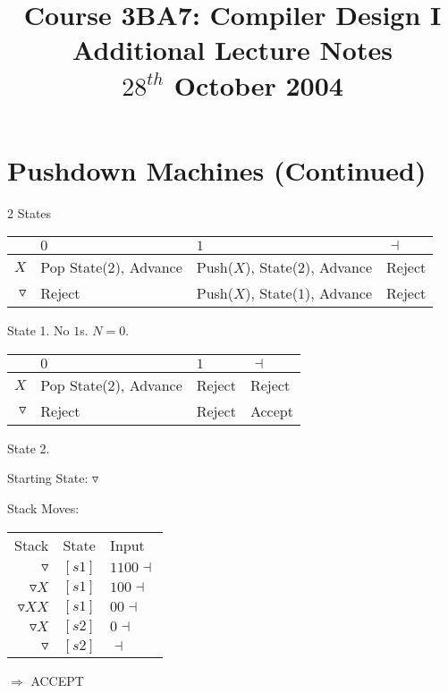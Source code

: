 \documentclass[a4paper,12pt]{article}
\begin{document}
\title{Course 3BA7: Compiler Design I \\ Additional Lecture Notes \\ $28^{th}$ October 2004}

\maketitle

\section{Pushdown Machines (Continued)}

2 States

\begin{tabular}{r|l|l|l|}
\hline
		&		$0$						&			$1$	&	$\dashv$	\\
\hline
$X$	&	Pop State($2$), Advance	& Push($X$), State($2$), Advance	& Reject \\
\hline
$\triangledown$	&	Reject	& Push($X$), State($1$), Advance	& Reject \\
\hline
\end{tabular}

State 1. No $1$s. $N = 0$.

\begin{tabular}{r|l|l|l|}
\hline
		&		$0$						&			$1$	&	$\dashv$	\\
\hline
$X$	&	Pop State($2$), Advance	& Reject	& Reject 		\\
\hline
$\triangledown$	&	Reject	& Reject & Accept			\\
\hline
\end{tabular}

State 2. %


Starting State: $\triangledown$

Stack Moves:

\begin{tabular}{rcl}
Stack								&	State		&	Input				\\
$\triangledown$			&	$[s1]$	&	$1100\dashv$	\\	
$\triangledown X$			&	$[s1]$	&	$100\dashv$	\\	
$\triangledown X X$		&	$[s1]$	&	$00\dashv$	\\	
$\triangledown X$			&	$[s2]$	&	$0\dashv$	\\	
$\triangledown$			&	$[s2]$	&	$\dashv$	\\	
\end{tabular}

$\Rightarrow$ ACCEPT
\end{document}

